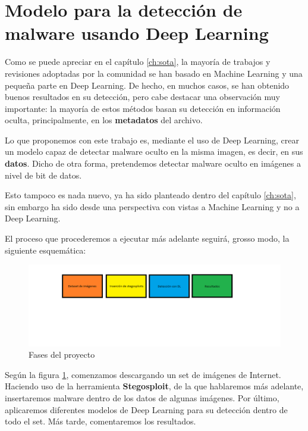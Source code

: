\section{Modelo para la detección de malware usando Deep Learning}

Como se puede apreciar en el capítulo \ref{ch:sota}, la mayoría de trabajos y revisiones adoptadas por la comunidad se han basado en Machine Learning y una pequeña parte en Deep Learning. De hecho, en muchos casos, se han obtenido buenos resultados en su detección, pero cabe destacar una observación muy importante: la mayoría de estos métodos basan su detección en información oculta, principalmente, en los \textbf{metadatos} del archivo.

Lo que proponemos con este trabajo es, mediante el uso de Deep Learning, crear un modelo capaz de detectar malware oculto en la misma imagen, es decir, en sus \textbf{datos}. Dicho de otra forma, pretendemos detectar malware oculto en imágenes a nivel de bit de datos.

Esto tampoco es nada nuevo, ya ha sido planteado dentro del capítulo \ref{ch:sota}, sin embargo ha sido desde una perspectiva con vistas a Machine Learning y no a Deep Learning.

El proceso que procederemos a ejecutar más adelante seguirá, grosso modo, la siguiente esquemática:

\begin{figure}[h]
  \centering
  \includegraphics[width=16cm]{Figuras/Introduccion/Descripcion_Trabajo.png}
  \caption{Fases del proyecto}
  \label{fig:diagrama_bloques}
\end{figure}

Según la figura \ref{fig:diagrama_bloques}, comenzamos descargando un set de imágenes de Internet. Haciendo uso de la herramienta \textbf{Stegosploit}, de la que hablaremos más adelante, insertaremos malware dentro de los datos de algunas imágenes. Por último, aplicaremos diferentes modelos de Deep Learning para su detección dentro de todo el set. Más tarde, comentaremos los resultados.

